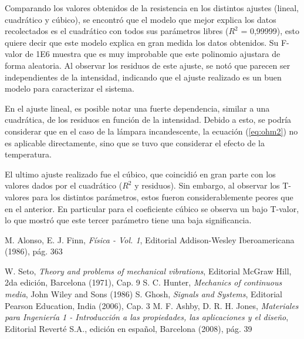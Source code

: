 \documentclass[twoside,twocolumn,a4paper]{article}
\begin{document}
Comparando los valores obtenidos de la resistencia en los distintos ajustes (lineal, cuadr\'atico y c\'ubico), se encontr\'o que el modelo que mejor explica los datos recolectados es el cuadr\'atico con todos sus par\'ametros libres ($R^2$ = 0,99999), esto quiere decir que este modelo explica en gran medida los datos obtenidos. Su F-valor de 1E6 muestra que es muy improbable que este polinomio ajustara de forma aleatoria. Al observar los residuos de este ajuste, se not\'o que parecen ser independientes de la intensidad, indicando que el ajuste realizado es un buen modelo para caracterizar el sistema.
\par

En el ajuste lineal, es posible notar una fuerte dependencia, similar a una cuadr\'atica, de los residuos en funci\'on de la intensidad. Debido a esto, se podr\'ia considerar que en el caso de la l\'ampara incandescente, la ecuaci\'on (\ref{eq:ohm2}) no es aplicable directamente, sino que se tuvo que considerar el efecto de la temperatura.

El ultimo ajuste realizado fue el c\'ubico, que coincidi\'o en gran parte con los valores dados por el cuadr\'atico ($R^2$ y residuos). Sin embargo, al observar los T-valores para los distintos par\'ametros, estos fueron considerablemente peores que en el anterior. En particular para el coeficiente c\'ubico se observa un bajo T-valor, lo que mostr\'o que este tercer par\'ametro tiene una baja significancia.


\begin{thebibliography}{99} %


 M. Alonso, E. J. Finn, \textit{F\'isica - Vol. 1}, Editorial Addison-Wesley Iberoamericana (1986), p\'ag. 363

 W. Seto, \textit{Theory and problems of mechanical vibrations}, Editorial McGraw Hill, 2da edici\'on, Barcelona (1971), Cap. 9
 S. C. Hunter, \textit{Mechanics of continuous media}, John Wiley and Sons (1986)
 S. Ghosh, \textit{Signals and Systems}, Editorial Pearson Education, India (2006), Cap. 3
 M. F. Ashby, D. R. H. Jones, \textit{Materiales para Ingenier\'ia 1 - Introducci\'on a las propiedades, las aplicaciones y el dise\~no}, Editorial Revert\'e S.A., edici\'on en espa\~nol, Barcelona (2008), p\'ag. 39

 
\end{thebibliography}


\end{document}
